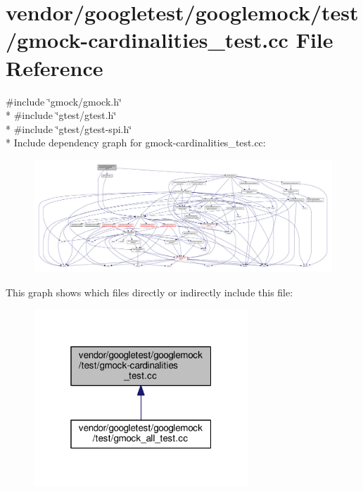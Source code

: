 \hypertarget{gmock-cardinalities__test_8cc}{}\section{vendor/googletest/googlemock/test/gmock-\/cardinalities\+\_\+test.cc File Reference}
\label{gmock-cardinalities__test_8cc}
{\ttfamily \#include \char`\"{}gmock/gmock.\+h\char`\"{}}\\*
{\ttfamily \#include \char`\"{}gtest/gtest.\+h\char`\"{}}\\*
{\ttfamily \#include \char`\"{}gtest/gtest-\/spi.\+h\char`\"{}}\\*
Include dependency graph for gmock-\/cardinalities\+\_\+test.cc\+:
\nopagebreak
\begin{figure}[H]
\begin{center}
\leavevmode
\includegraphics[width=350pt]{gmock-cardinalities__test_8cc__incl}
\end{center}
\end{figure}
This graph shows which files directly or indirectly include this file\+:
\nopagebreak
\begin{figure}[H]
\begin{center}
\leavevmode
\includegraphics[width=229pt]{gmock-cardinalities__test_8cc__dep__incl}
\end{center}
\end{figure}
